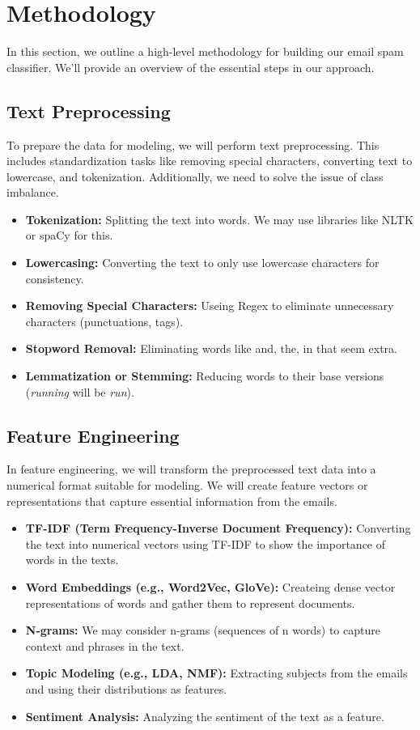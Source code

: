 \documentclass[conference]{IEEEtran}
\begin{document}
\section{Methodology}
In this section, we outline a high-level methodology for building our email spam classifier. We'll provide an overview of the essential steps in our approach.

\subsection{Text Preprocessing}
To prepare the data for modeling, we will perform text preprocessing. This includes standardization tasks like removing special characters, converting text to lowercase, and tokenization. Additionally, we need to solve the issue of class imbalance.

\begin{itemize}
    \item \textbf{Tokenization:} Splitting the text into words. We may use libraries like NLTK or spaCy for this.
    \item \textbf{Lowercasing:} Converting the text to only use lowercase characters for consistency.
    \item \textbf{Removing Special Characters:} Useing Regex to eliminate unnecessary characters (punctuations, tags).
    \item \textbf{Stopword Removal:} Eliminating words like and, the, in that seem extra.
    \item \textbf{Lemmatization or Stemming:} Reducing words to their base versions (\textit{running} will be \textit{run}).
\end{itemize}

\subsection{Feature Engineering}
In feature engineering, we will transform the preprocessed text data into a numerical format suitable for modeling. We will create feature vectors or representations that capture essential information from the emails.

\begin{itemize}
    \item \textbf{TF-IDF (Term Frequency-Inverse Document Frequency):} Converting the text into numerical vectors using TF-IDF to show the importance of words in the texts.
    \item \textbf{Word Embeddings (e.g., Word2Vec, GloVe):} Createing dense vector representations of words and gather them to represent documents.
    \item \textbf{N-grams:} We may consider n-grams (sequences of n words) to capture context and phrases in the text.
    \item \textbf{Topic Modeling (e.g., LDA, NMF):} Extracting subjects from the emails and using their distributions as features.
    \item \textbf{Sentiment Analysis:} Analyzing the sentiment of the text as a feature.
\end{itemize}
\end{document}
